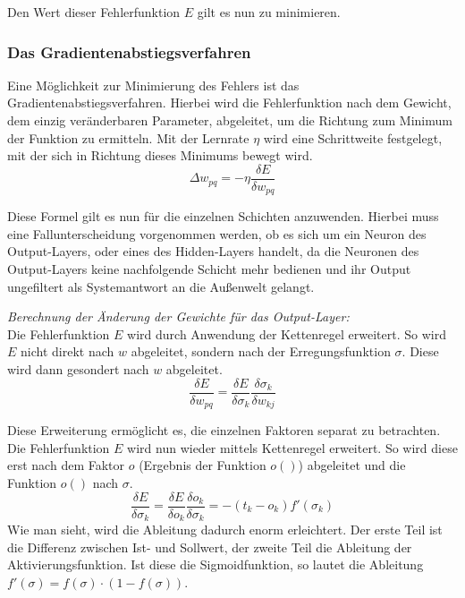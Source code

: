 Den Wert dieser Fehlerfunktion $E$ gilt es nun zu minimieren.

\subsubsection{Das Gradientenabstiegsverfahren}
Eine Möglichkeit zur Minimierung des Fehlers ist das Gradientenabstiegsverfahren. Hierbei wird die Fehlerfunktion nach dem Gewicht, dem einzig veränderbaren Parameter, abgeleitet, um die Richtung zum Minimum der Funktion zu ermitteln. Mit der Lernrate $\eta$ wird eine Schrittweite festgelegt, mit der sich in Richtung dieses Minimums bewegt wird.
\begin{equation}
\Delta w_{pq}=-\eta \frac{\delta E}{\delta w_{pq}}
\end{equation}

Diese Formel gilt es nun für die einzelnen Schichten anzuwenden. Hierbei muss eine Fallunterscheidung vorgenommen werden, ob es sich um ein Neuron des Output-Layers, oder eines des Hidden-Layers handelt, da die Neuronen des Output-Layers keine nachfolgende Schicht mehr bedienen und ihr Output ungefiltert als Systemantwort an die Außenwelt gelangt.

\emph{Berechnung der Änderung der Gewichte für das Output-Layer:}
\\Die Fehlerfunktion $E$ wird durch Anwendung der Kettenregel erweitert. So wird $E$ nicht direkt nach $w$ abgeleitet, sondern nach der Erregungsfunktion $\sigma$. Diese wird dann gesondert nach $w$ abgeleitet.
\begin{equation}
\frac{\delta E}{\delta w_{pq}} = \frac{\delta E}{\delta \sigma_{k}} \frac{\delta \sigma_{k}}{\delta w_{kj}}
\label{eqn:output-erw}
\end{equation}

Diese Erweiterung ermöglicht es, die einzelnen Faktoren separat zu betrachten. Die Fehlerfunktion $E$ wird nun wieder mittels Kettenregel erweitert. So wird diese erst nach dem Faktor $o$ (Ergebnis der Funktion $o()$) abgeleitet und die Funktion $o()$ nach $\sigma$.
\begin{equation}
\frac{\delta E}{\delta \sigma_{k}} = \frac{\delta E}{\delta o_{k}} \frac{\delta o_k}{\delta \sigma_k} = -(t_k - o_k) f'(\sigma_k)
\end{equation}
Wie man sieht, wird die Ableitung dadurch enorm erleichtert. Der erste Teil ist die Differenz zwischen Ist- und Sollwert, der zweite Teil die Ableitung der Aktivierungsfunktion. Ist diese die Sigmoidfunktion, so lautet die Ableitung $f'(\sigma)=f(\sigma)\cdot (1-f(\sigma))$.

